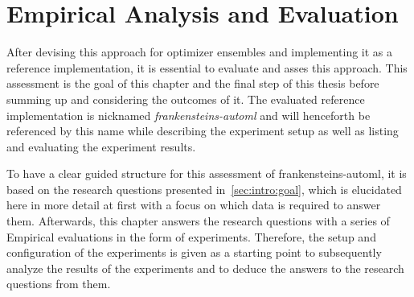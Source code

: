 %
\chapter{Empirical Analysis and Evaluation}
\label{sec:evaluation}
After devising this approach for optimizer ensembles and implementing it as a reference implementation, it is essential to evaluate and asses this approach.
This assessment is the goal of this chapter and the final step of this thesis before summing up and considering the outcomes of it.
The evaluated reference implementation is nicknamed \textit{frankensteins-automl} and will henceforth be referenced by this name while describing the experiment setup as well as listing and evaluating the experiment results.

To have a clear guided structure for this assessment of frankensteins-automl, it is based on the research questions presented in~\ref{sec:intro:goal}, which is elucidated here in more detail at first with a focus on which data is required to answer them.
Afterwards, this chapter answers the research questions with a series of Empirical evaluations in the form of experiments.\newline
Therefore, the setup and configuration of the experiments is given as a starting point to subsequently analyze the results of the experiments and to deduce the answers to the research questions from them.

